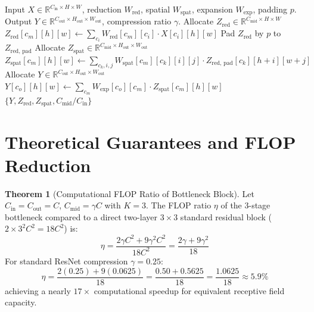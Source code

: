 \documentclass[11pt,a4paper]{article}
\theoremstyle{definition}
\newtheorem{theorem}{Theorem}[section]
\begin{document}
\begin{algorithm}[H]
\caption{3-Stage Bottleneck Convolutional Block}
\label{alg:bottleneck_block}
\begin{algorithmic}[1]
\Require Input $X \in \mathbb{R}^{C_{\text{in}} \times H \times W}$, reduction $W_{\text{red}}$, spatial $W_{\text{spat}}$, expansion $W_{\text{exp}}$, padding $p$.
\Ensure Output $Y \in \mathbb{R}^{C_{\text{out}} \times H_{\text{out}} \times W_{\text{out}}}$, compression ratio $\gamma$.
\State Allocate $Z_{\text{red}} \in \mathbb{R}^{C_{\text{mid}} \times H \times W}$
            \State $Z_{\text{red}}[c_m][h][w] \gets \sum_{c_i} W_{\text{red}}[c_m][c_i] \cdot X[c_i][h][w]$
        \EndFor
    \EndFor
\EndFor
\State Pad $Z_{\text{red}}$ by $p$ to $Z_{\text{red, pad}}$
\State Allocate $Z_{\text{spat}} \in \mathbb{R}^{C_{\text{mid}} \times H_{\text{out}} \times W_{\text{out}}}$
            \State $Z_{\text{spat}}[c_m][h][w] \gets \sum_{c_k, i, j} W_{\text{spat}}[c_m][c_k][i][j] \cdot Z_{\text{red, pad}}[c_k][h+i][w+j]$
        \EndFor
    \EndFor
\EndFor
\State Allocate $Y \in \mathbb{R}^{C_{\text{out}} \times H_{\text{out}} \times W_{\text{out}}}$
            \State $Y[c_o][h][w] \gets \sum_{c_m} W_{\text{exp}}[c_o][c_m] \cdot Z_{\text{spat}}[c_m][h][w]$
        \EndFor
    \EndFor
\EndFor
\State \Return $\{Y, Z_{\text{red}}, Z_{\text{spat}}, C_{\text{mid}} / C_{\text{in}}\}$
\end{algorithmic}
\end{algorithm}

\section{Theoretical Guarantees and FLOP Reduction}

\begin{theorem}[Computational FLOP Ratio of Bottleneck Block]
Let $C_{\text{in}} = C_{\text{out}} = C$, $C_{\text{mid}} = \gamma C$ with $K = 3$. The FLOP ratio $\eta$ of the 3-stage bottleneck compared to a direct two-layer $3 \times 3$ standard residual block ($2 \times 3^2 C^2 = 18 C^2$) is:
\begin{equation}
\eta = \frac{2 \gamma C^2 + 9 \gamma^2 C^2}{18 C^2} = \frac{2\gamma + 9\gamma^2}{18}
\end{equation}
For standard ResNet compression $\gamma = 0.25$:
\begin{equation}
\eta = \frac{2(0.25) + 9(0.0625)}{18} = \frac{0.50 + 0.5625}{18} = \frac{1.0625}{18} \approx 5.9\%
\end{equation}
achieving a nearly $17\times$ computational speedup for equivalent receptive field capacity.
\end{theorem}
\end{document}
